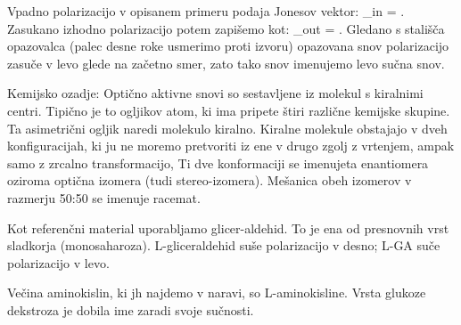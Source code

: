 Vpadno polarizacijo v opisanem primeru podaja Jonesov vektor:
\beq
{}_{in} = 
\left[\begin{array}{c}
1\\
0\\
\end{array}\right]\!\!.
\label{eq:09_40}
\eeq
Zasukano izhodno polarizacijo potem zapišemo kot:
\beq
{}_{out} = 
\!\!.
\label{eq:09_41}
\eeq
Gledano s stališča opazovalca (palec desne roke usmerimo proti izvoru) opazovana
snov polarizacijo zasuče v levo glede na začetno smer, zato tako snov imenujemo
levo sučna snov. 

Kemijsko ozadje:
Optično aktivne snovi so sestavljene iz molekul s kiralnimi centri. Tipično je 
to ogljikov atom, ki ima pripete štiri različne kemijske skupine. Ta asimetrični
ogljik naredi molekulo kiralno. Kiralne molekule obstajajo v dveh konfiguracijah,
ki ju ne moremo pretvoriti iz ene v drugo zgolj z vrtenjem, ampak samo z zrcalno
transformacijo, Ti dve konformaciji se imenujeta enantiomera oziroma
optična izomera (tudi stereo-izomera). Mešanica obeh izomerov v razmerju 50:50
se imenuje racemat. 

Kot referenčni material uporabljamo glicer-aldehid. To je ena od presnovnih 
vrst sladkorja (monosaharoza). L-gliceraldehid suše polarizacijo v desno; L-GA
suče polarizacijo v levo. 

Večina aminokislin, ki jh najdemo v naravi, so L-aminokisline. Vrsta glukoze 
dekstroza je dobila ime zaradi svoje sučnosti. 

